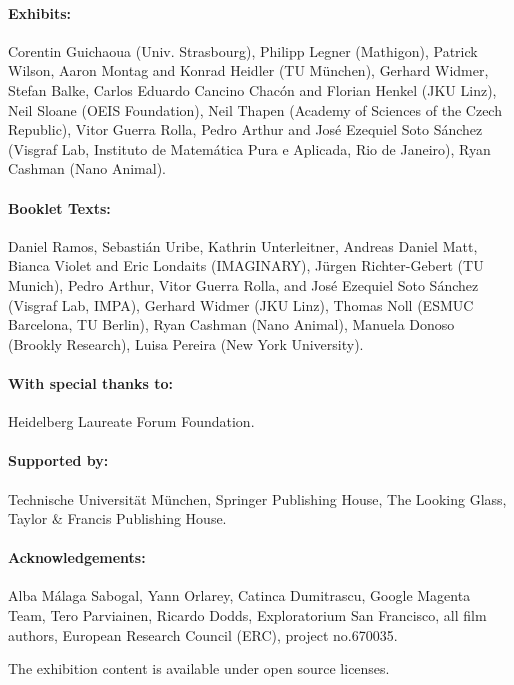 \paragraph{Exhibits:}
Corentin Guichaoua (Univ. Strasbourg), Philipp Legner (Mathigon), Patrick Wilson, Aaron Montag and Konrad Heidler (TU
 München), Gerhard Widmer, Stefan Balke, Carlos Eduardo Cancino Chacón and Florian Henkel (JKU Linz), Neil Sloane (OEIS Foundation), Neil Thapen (Academy of Sciences of the Czech Republic), Vitor Guerra Rolla, Pedro Arthur and José Ezequiel Soto Sánchez (Visgraf Lab, Instituto de Matemática Pura e Aplicada, Rio de Janeiro), Ryan Cashman (Nano Animal).

\paragraph{Booklet Texts:}
Daniel Ramos, Sebastián Uribe, Kathrin Unterleitner, Andreas Daniel Matt, Bianca Violet and Eric Londaits (IMAGINARY), Jürgen Richter-Gebert (TU Munich), Pedro Arthur, Vitor Guerra Rolla, and José Ezequiel Soto Sánchez (Visgraf Lab, IMPA), Gerhard Widmer (JKU Linz), Thomas Noll (ESMUC Bar\-ce\-lo\-na, TU Berlin), Ryan Cashman (Nano Animal), Manuela Donoso (Brookly Research), Luisa Pereira (New York University).

\paragraph{With special thanks to:}
Heidelberg Laureate Forum Foundation.

\paragraph{Supported by:}
Technische Universität München, Springer Publishing House, The Looking Glass, Taylor \& Francis Publishing House.

\paragraph{Acknowledgements:}
Alba Málaga Sabogal, Yann Orlarey, Catinca Dumitrascu, Google Magenta Team, Tero Parviainen, Ricardo Dodds, Exploratorium San Francisco, all film authors, European Research Council (ERC), project no.670035.


The exhibition content is available under open source licenses.
\normalsize
